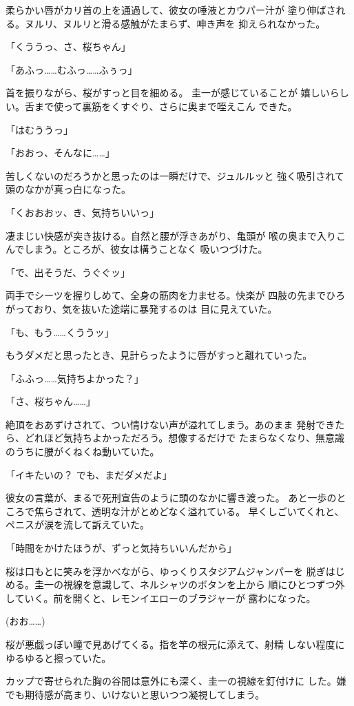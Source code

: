 ﻿\documentclass[
    book,tate,
    line_length=30zw,
    jafontsize=12pt,
    paper=b5j,
    landscape,
    ]{jlreq}
\begin{document}
柔らかい唇がカリ首の上を通過して、彼女の唾液とカウパー汁が
塗り伸ばされる。ヌルリ、ヌルリと滑る感触がたまらず、呻き声を
抑えられなかった。

「くううっ、さ、桜ちゃん」

「あふっ……むふっ……ふぅっ」

首を振りながら、桜がすっと目を細める。 圭一が感じていることが
嬉しいらしい。舌まで使って裏筋をくすぐり、さらに奥まで咥えこん
できた。

「はむううっ」

「おおっ、そんなに……」

苦しくないのだろうかと思ったのは一瞬だけで、ジュルルッと
強く吸引されて頭のなかが真っ白になった。

「くおおおッ、き、気持ちいいっ」

凄まじい快感が突き抜ける。自然と腰が浮きあがり、亀頭が
喉の奥まで入りこんでしまう。ところが、彼女は構うことなく
吸いつづけた。

「で、出そうだ、うぐぐッ」

両手でシーツを握りしめて、全身の筋肉を力ませる。快楽が
四肢の先までひろがっており、気を抜いた途端に暴発するのは
目に見えていた。

「も、もう……くううッ」

もうダメだと思ったとき、見計らったように唇がすっと離れていった。

「ふふっ……気持ちよかった？」

「さ、桜ちゃん……」

絶頂をおあずけされて、つい情けない声が溢れてしまう。あのまま
発射できたら、どれほど気持ちよかっただろう。想像するだけで
たまらなくなり、無意識のうちに腰がくねくね動いていた。

「イキたいの？ でも、まだダメだよ」

彼女の言葉が、まるで死刑宣告のように頭のなかに響き渡った。
あと一歩のところで焦らされて、透明な汁がとめどなく溢れている。
早くしごいてくれと、ペニスが涙を流して訴えていた。

「時間をかけたほうが、ずっと気持ちいいんだから」

桜は口もとに笑みを浮かべながら、ゆっくりスタジアムジャンパーを
脱ぎはじめる。圭一の視線を意識して、ネルシャツのボタンを上から
順にひとつずつ外していく。前を開くと、レモンイエローのブラジャーが
露わになった。

(おお……)

桜が悪戯っぽい瞳で見あげてくる。指を竿の根元に添えて、射精
しない程度にゆるゆると擦っていた。

カップで寄せられた胸の谷間は意外にも深く、圭一の視線を釘付けに
した。嫌でも期待感が高まり、いけないと思いつつ凝視してしまう。
\end{document}
